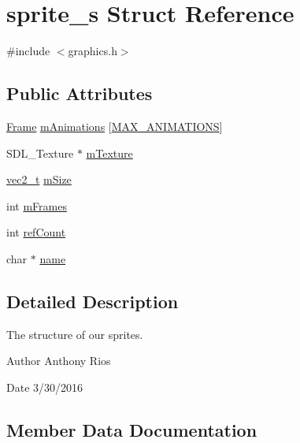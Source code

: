 \hypertarget{structsprite__s}{}\section{sprite\+\_\+s Struct Reference}
\label{structsprite__s}


{\ttfamily \#include $<$graphics.\+h$>$}

\subsection*{Public Attributes}
\begin{DoxyCompactItemize}
\item 
\hyperlink{struct_frame}{Frame} \hyperlink{structsprite__s_a99d8fe22b1f80e3df25c0c722abfb9ce}{m\+Animations} \mbox{[}\hyperlink{graphics_8h_a99f9cfd68ef4237b568bda6e3e63312f}{M\+A\+X\+\_\+\+A\+N\+I\+M\+A\+T\+I\+O\+NS}\mbox{]}
\item 
S\+D\+L\+\_\+\+Texture $\ast$ \hyperlink{structsprite__s_aa10951343a2acdd8a4b80db72ad7ef5c}{m\+Texture}
\item 
\hyperlink{globals_8h_a773f2054819bb6014f1e50baa39cb5e3}{vec2\+\_\+t} \hyperlink{structsprite__s_a2d4e640dfc835d00036c58bc5c36c85f}{m\+Size}
\item 
int \hyperlink{structsprite__s_a3c33937a6472eb2c75de735cb838eb57}{m\+Frames}
\item 
int \hyperlink{structsprite__s_a7d4ba5f7754122c2c538e9e0a2ec2b09}{ref\+Count}
\item 
char $\ast$ \hyperlink{structsprite__s_ab26c23fcaa6b5365629d2ddfaa5b9482}{name}
\end{DoxyCompactItemize}


\subsection{Detailed Description}
The structure of our sprites.

\begin{DoxyAuthor}{Author}
Anthony Rios 
\end{DoxyAuthor}
\begin{DoxyDate}{Date}
3/30/2016 
\end{DoxyDate}


\subsection{Member Data Documentation}
